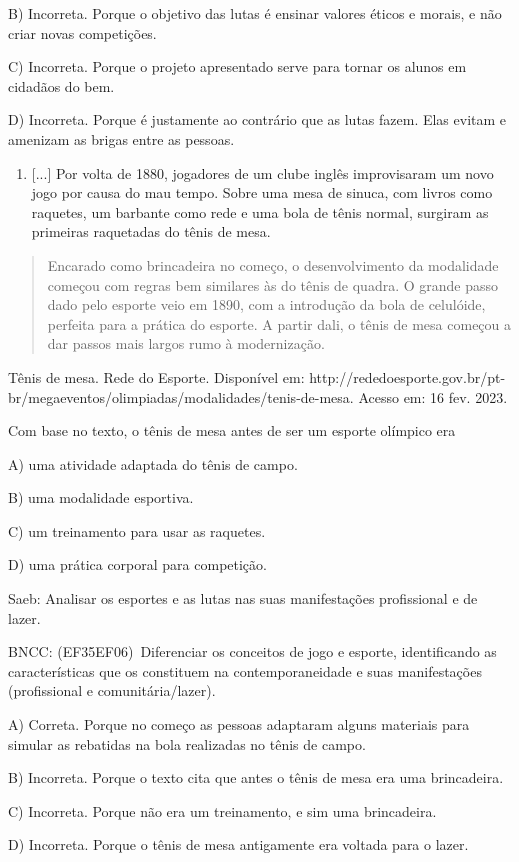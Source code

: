 B) Incorreta. Porque o objetivo das lutas é ensinar valores éticos e
morais, e não criar novas competições.

C) Incorreta. Porque o projeto apresentado serve para tornar os alunos
em cidadãos do bem.

D) Incorreta. Porque é justamente ao contrário que as lutas fazem. Elas
evitam e amenizam as brigas entre as pessoas.

\begin{enumerate}
\def\labelenumi{\arabic{enumi}.}
\item
  {[}...{]} Por volta de 1880, jogadores de um clube inglês improvisaram
  um novo jogo por causa do mau tempo. Sobre uma mesa de sinuca, com
  livros como raquetes, um barbante como rede e uma bola de tênis
  normal, surgiram as primeiras raquetadas do tênis de mesa.
\end{enumerate}

\begin{quote}
Encarado como brincadeira no começo, o desenvolvimento da modalidade
começou com regras bem similares às do tênis de quadra. O grande passo
dado pelo esporte veio em 1890, com a introdução da bola de celulóide,
perfeita para a prática do esporte. A partir dali, o tênis de mesa
começou a dar passos mais largos rumo à modernização.
\end{quote}

Tênis de mesa. Rede do Esporte. Disponível em:
http://rededoesporte.gov.br/pt-br/megaeventos/olimpiadas/modalidades/tenis-de-mesa.
Acesso em: 16 fev. 2023.

Com base no texto, o tênis de mesa antes de ser um esporte olímpico era

A) uma atividade adaptada do tênis de campo.

B) uma modalidade esportiva.

C) um treinamento para usar as raquetes.

D) uma prática corporal para competição.

Saeb:\protect\hypertarget{_Hlk127431611}{}{} Analisar os esportes e as
lutas nas suas manifestações profissional e de lazer.

BNCC: (EF35EF06)~Diferenciar os conceitos de jogo e esporte,
identificando as características que os constituem na contemporaneidade
e suas manifestações (profissional e comunitária/lazer).

A) Correta. Porque no começo as pessoas adaptaram alguns materiais para
simular as rebatidas na bola realizadas no tênis de campo.

B) Incorreta. Porque o texto cita que antes o tênis de mesa era uma
brincadeira.

C) Incorreta. Porque não era um treinamento, e sim uma brincadeira.

D) Incorreta. Porque o tênis de mesa antigamente era voltada para o
lazer.
